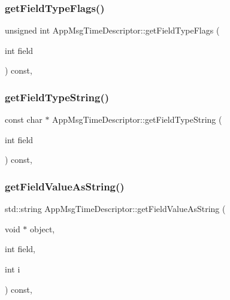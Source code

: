\subsubsection{\texorpdfstring{get\+Field\+Type\+Flags()}{getFieldTypeFlags()}}
{\footnotesize\ttfamily unsigned int App\+Msg\+Time\+Descriptor\+::get\+Field\+Type\+Flags (\begin{DoxyParamCaption}\item[{int}]{field }\end{DoxyParamCaption}) const\hspace{0.3cm}{\ttfamily [override]}, {\ttfamily [virtual]}}

\mbox{\label{class_app_msg_time_descriptor_a576cceeffd841b561c7c8f9bb92fff85}} 
\subsubsection{\texorpdfstring{get\+Field\+Type\+String()}{getFieldTypeString()}}
{\footnotesize\ttfamily const char $\ast$ App\+Msg\+Time\+Descriptor\+::get\+Field\+Type\+String (\begin{DoxyParamCaption}\item[{int}]{field }\end{DoxyParamCaption}) const\hspace{0.3cm}{\ttfamily [override]}, {\ttfamily [virtual]}}

\mbox{\label{class_app_msg_time_descriptor_adfd92cca9d3fdd2705e303d1f5121c07}} 
\subsubsection{\texorpdfstring{get\+Field\+Value\+As\+String()}{getFieldValueAsString()}}
{\footnotesize\ttfamily std\+::string App\+Msg\+Time\+Descriptor\+::get\+Field\+Value\+As\+String (\begin{DoxyParamCaption}\item[{void $\ast$}]{object,  }\item[{int}]{field,  }\item[{int}]{i }\end{DoxyParamCaption}) const\hspace{0.3cm}{\ttfamily [override]}, {\ttfamily [virtual]}}

